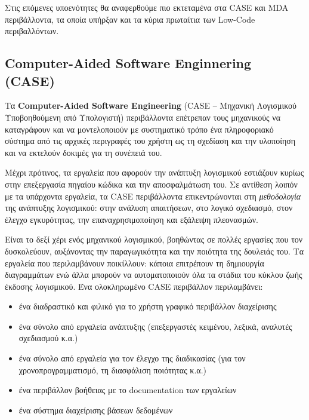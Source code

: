         Στις επόμενες υποενότητες θα αναφερθούμε πιο εκτεταμένα στα CASE και MDA περιβάλλοντα, τα οποία υπήρξαν και τα κύρια πρωταίτια των Low-Code περιβαλλόντων.

        \subsection{Computer-Aided Software Enginnering (CASE)}
            Τα \textbf{Computer-Aided Software Engineering} (CASE -- Μηχανική Λογισμικού Υποβοηθούμενη από Υπολογιστή) περιβάλλοντα επέτρεπαν τους μηχανικούς να καταγράφουν και να μοντελοποιούν με συστηματικό τρόπο ένα πληροφοριακό σύστημα από τις αρχικές περιγραφές του χρήστη ως τη σχεδίαση και την υλοποίηση και να εκτελούν δοκιμές για τη συνέπειά του.

            Μέχρι πρότινος, τα εργαλεία που αφορούν την ανάπτυξη λογισμικού εστιάζουν κυρίως στην επεξεργασία πηγαίου κώδικα και την αποσφαλμάτωση του. Σε αντίθεση λοιπόν με τα υπάρχοντα εργαλεία, τα CASE περιβάλλοντα επικεντρώνονται στη \textit{μεθοδολογία} της ανάπτυξης λογισμικού: στην ανάλυση απαιτήσεων, στο λογικό σχεδιασμό, στον έλεγχο εγκυρότητας, την επαναχρησιμοποίηση και εξάλειψη πλεονασμών.

            Είναι το δεξί χέρι ενός μηχανικού λογισμικού, βοηθώντας σε πολλές εργασίες που τον δυσκολεύουν, αυξάνοντας την παραγωγικότητα και την ποιότητα της δουλειάς του. Τα εργαλεία που περιλαμβάνουν ποικίλλουν: κάποια επιτρέπουν τη δημιουργία διαγραμμάτων ενώ άλλα μπορούν να αυτοματοποιούν όλα τα στάδια του κύκλου ζωής έκδοσης λογισμικού. Ένα ολοκληρωμένο CASE περιβάλλον περιλαμβάνει:
            \vspace{-0.5em}
            \begin{itemize}[label={\tiny \blacksquare}]
                \setlength\itemsep{-0.25em}
                \item ένα διαδραστικό και φιλικό για το χρήστη γραφικό περιβάλλον διαχείρισης
                \item ένα σύνολο από εργαλεία ανάπτυξης (επεξεργαστές κειμένου, λεξικά, αναλυτές σχεδιασμού κ.α.)
                \item ένα σύνολο από εργαλεία για τον έλεγχο της διαδικασίας (για τον χρονοπρογραμματισμό, τη διασφάλιση ποιότητας κ.α.)
                \item ένα περιβάλλον βοήθειας με το documentation των εργαλείων
                \item ένα σύστημα διαχείρισης βάσεων δεδομένων
            \end{itemize}
            \vspace{-0.5em}

